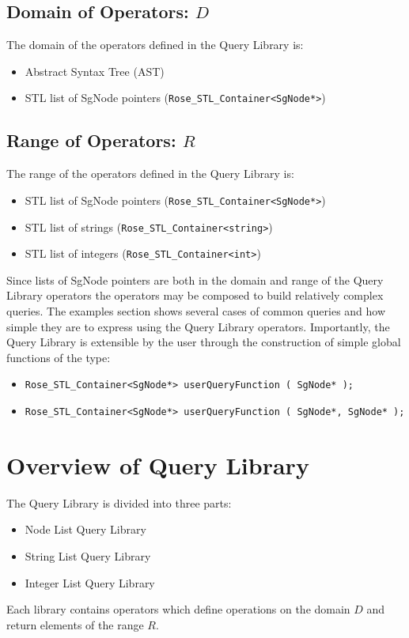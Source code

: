 {\subsection{Domain of Operators: $D$}
    The domain of the operators defined in the Query Library is:
\begin{itemize}
     \item Abstract Syntax Tree (AST)
     \item STL list of SgNode pointers ({\tt Rose_STL_Container<SgNode*>})
\end{itemize}

\subsection{Range of Operators: $R$}
    The range of the operators defined in the Query Library is:
\begin{itemize}
     \item STL list of SgNode pointers ({\tt Rose_STL_Container<SgNode*>})
     \item STL list of strings ({\tt Rose_STL_Container<string>})
     \item STL list of integers ({\tt Rose_STL_Container<int>})
\end{itemize}

Since lists of SgNode pointers are both in the domain and range of the Query Library
operators the operators may be composed to build relatively complex queries.  The examples
section shows several cases of common queries and how simple they are to express
using the Query Library operators.  Importantly, the Query Library is extensible
by the user through the construction of simple global functions of the type:
\begin{itemize}
     \item {\tt Rose_STL_Container<SgNode*> userQueryFunction ( SgNode* );}
     \item {\tt Rose_STL_Container<SgNode*> userQueryFunction ( SgNode*, SgNode* );}
\end{itemize}

\section{Overview of Query Library}
    The Query Library is divided into three parts:
\begin{itemize}
     \item Node List Query Library
     \item String List Query Library
     \item Integer List Query Library
\end{itemize}
Each library contains operators which define operations on the domain $D$ and
return elements of the range $R$.

}

